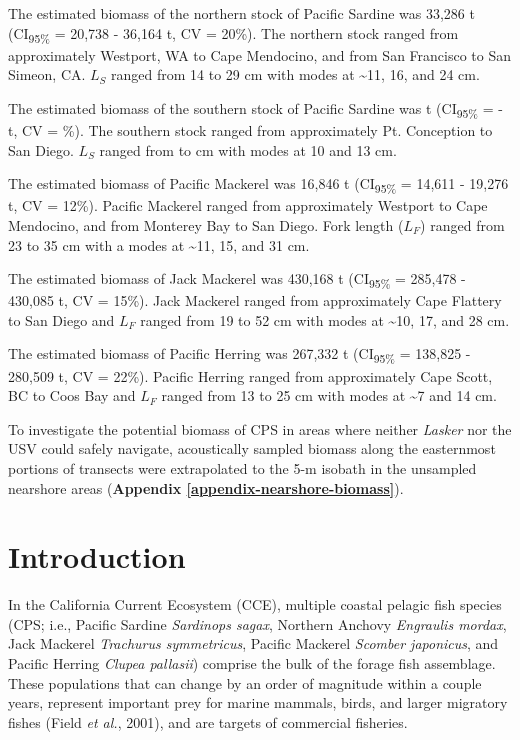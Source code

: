 \documentclass[]{article}
\begin{document}
The estimated biomass of the northern stock of Pacific Sardine was 33,286 t (CI\textsubscript{95\%} = 20,738 - 36,164 t, CV = 20\%). The northern stock ranged from approximately Westport, WA to Cape Mendocino, and from San Francisco to San Simeon, CA. \(L_S\) ranged from 14 to 29 cm with modes at \textasciitilde11, 16, and 24 cm.

The estimated biomass of the southern stock of Pacific Sardine was t (CI\textsubscript{95\%} = - t, CV = \%). The southern stock ranged from approximately Pt. Conception to San Diego. \(L_S\) ranged from to cm with modes at 10 and 13 cm.

The estimated biomass of Pacific Mackerel was 16,846 t (CI\textsubscript{95\%} = 14,611 - 19,276 t, CV = 12\%). Pacific Mackerel ranged from approximately Westport to Cape Mendocino, and from Monterey Bay to San Diego. Fork length (\(L_F\)) ranged from 23 to 35 cm with a modes at \textasciitilde11, 15, and 31 cm.

The estimated biomass of Jack Mackerel was 430,168 t (CI\textsubscript{95\%} = 285,478 - 430,085 t, CV = 15\%). Jack Mackerel ranged from approximately Cape Flattery to San Diego and \(L_F\) ranged from 19 to 52 cm with modes at \textasciitilde10, 17, and 28 cm.

The estimated biomass of Pacific Herring was 267,332 t (CI\textsubscript{95\%} = 138,825 - 280,509 t, CV = 22\%). Pacific Herring ranged from approximately Cape Scott, BC to Coos Bay and \(L_F\) ranged from 13 to 25 cm with modes at \textasciitilde7 and 14 cm.

To investigate the potential biomass of CPS in areas where neither \emph{Lasker} nor the USV could safely navigate, acoustically sampled biomass along the easternmost portions of transects were extrapolated to the 5-m isobath in the unsampled nearshore areas (\textbf{Appendix \ref{appendix-nearshore-biomass}}).

\newpage

\hypertarget{introduction}{%
\section{Introduction}\label{introduction}}

In the California Current Ecosystem (CCE), multiple coastal pelagic fish species (CPS; i.e., Pacific Sardine \emph{Sardinops sagax}, Northern Anchovy \emph{Engraulis mordax}, Jack Mackerel \emph{Trachurus symmetricus}, Pacific Mackerel \emph{Scomber japonicus}, and Pacific Herring \emph{Clupea pallasii}) comprise the bulk of the forage fish assemblage. These populations that can change by an order of magnitude within a couple years, represent important prey for marine mammals, birds, and larger migratory fishes (Field \emph{et al.}, 2001), and are targets of commercial fisheries.
\end{document}
